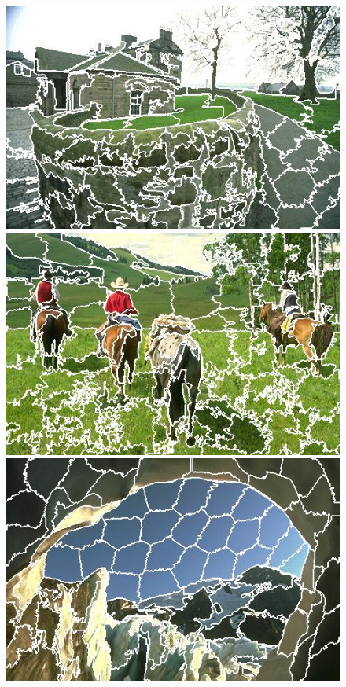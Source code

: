 \begin{figure}[h]
{\begin{minipage}[b]{0.13\linewidth}
\includegraphics[width=1\linewidth]{figures/img/LSC/LSC_92014.jpg}
\includegraphics[width=1\linewidth]{figures/img/LSC/LSC_220003.jpg}
\includegraphics[width=1\linewidth]{figures/img/LSC/LSC_176051.jpg}

\end{minipage}}
\end{figure}
